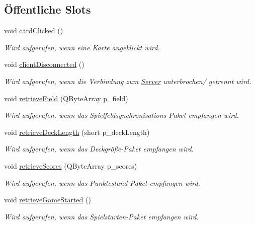 \subsection*{Öffentliche Slots}
\begin{DoxyCompactItemize}
\item 
void \hyperlink{class_window_a5b62d2f0db72e3aad9d9b434fb692099}{card\+Clicked} ()
\begin{DoxyCompactList}\small\item\em Wird aufgerufen, wenn eine Karte angeklickt wird. \end{DoxyCompactList}\item 
void \hyperlink{class_window_acbd3c3b8edec3bd791c9f8d3e1ed3042}{client\+Disconnected} ()
\begin{DoxyCompactList}\small\item\em Wird aufgerufen, wenn die Verbindung zum \hyperlink{class_server}{Server} unterbrochen/ getrennt wird. \end{DoxyCompactList}\item 
void \hyperlink{class_window_a0c75a360bfab238425c2e0616151fb56}{retrieve\+Field} (Q\+Byte\+Array p\+\_\+field)
\begin{DoxyCompactList}\small\item\em Wird aufgerufen, wenn das Spielfeldsynchronisations-\/\+Paket empfangen wird. \end{DoxyCompactList}\item 
void \hyperlink{class_window_af7ad0380c530c760cf23a63a41dc47f6}{retrieve\+Deck\+Length} (short p\+\_\+deck\+Length)
\begin{DoxyCompactList}\small\item\em Wird aufgerufen, wenn das Deckgröße-\/\+Paket empfangen wird. \end{DoxyCompactList}\item 
void \hyperlink{class_window_a4f216b408b601635457f24f1662cb07b}{retrieve\+Scores} (Q\+Byte\+Array p\+\_\+scores)
\begin{DoxyCompactList}\small\item\em Wird aufgerufen, wenn das Punktestand-\/\+Paket empfangen wird. \end{DoxyCompactList}\item 
void \hyperlink{class_window_a9ee18fce7c1aa1c4699b2e279b71f3a8}{retrieve\+Game\+Started} ()
\begin{DoxyCompactList}\small\item\em Wird aufgerufen, wenn das Spielstarten-\/\+Paket empfangen wird. \end{DoxyCompactList}\item 

\end{DoxyCompactItemize}
